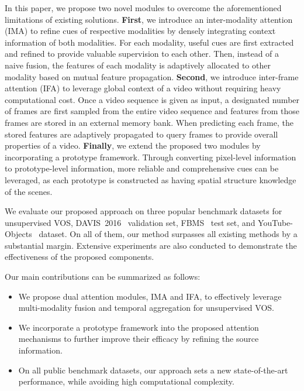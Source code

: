 \documentclass[10pt,twocolumn,letterpaper]{article}
\begin{document}
In this paper, we propose two novel modules to overcome the aforementioned limitations of existing solutions. \textbf{First}, we introduce an inter-modality attention (IMA) to refine cues of respective modalities by densely integrating context information of both modalities. For each modality, useful cues are first extracted and refined to provide valuable supervision to each other. Then, instead of a naive fusion, the features of each modality is adaptively allocated to other modality based on mutual feature propagation. \textbf{Second}, we introduce inter-frame attention (IFA) to leverage global context of a video without requiring heavy computational cost. Once a video sequence is given as input, a designated number of frames are first sampled from the entire video sequence and features from those frames are stored in an external memory bank. When predicting each frame, the stored features are adaptively propagated to query frames to provide overall properties of a video. \textbf{Finally}, we extend the proposed two modules by incorporating a prototype framework. Through converting pixel-level information to prototype-level information, more reliable and comprehensive cues can be leveraged, as each prototype is constructed as having spatial structure knowledge of the scenes. 



We evaluate our proposed approach on three popular benchmark datasets for unsupervised VOS, DAVIS~2016~\cite{DAVIS} validation set, FBMS~\cite{FBMS} test set, and YouTube-Objects~\cite{YTOBJ} dataset. On all of them, our method surpasses all existing methods by a substantial margin. Extensive experiments are also conducted to demonstrate the effectiveness of the proposed components. 


Our main contributions can be summarized as follows:
\begin{itemize}[leftmargin=0.2in]
\item We propose dual attention modules, IMA and IFA, to effectively leverage multi-modality fusion and temporal aggregation for unsupervised VOS.

\item We incorporate a prototype framework into the proposed attention mechanisms to further improve their efficacy by refining the source information. 

\item On all public benchmark datasets, our approach sets a new state-of-the-art performance, while avoiding high computational complexity.
\end{itemize} 
\end{document}
